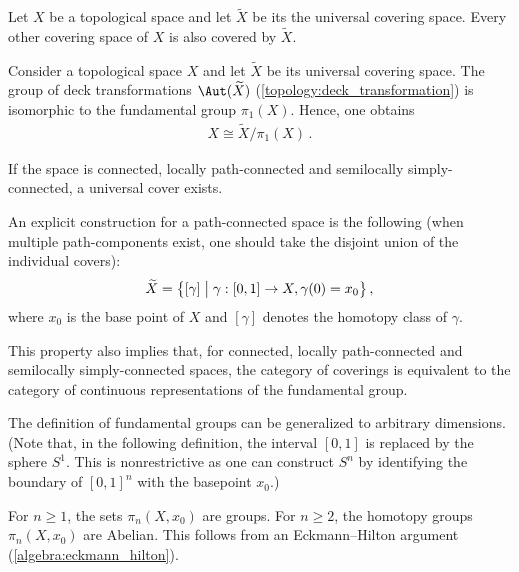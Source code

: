     \begin{uproperty}
        Let $X$ be a topological space and let $\widetilde{X}$ be its the universal covering space. Every other covering space of $X$ is also covered by $\widetilde{X}$.
    \end{uproperty}
    \begin{property}[Automorphisms]\label{topology:universal_cover_automorphisms}
        Consider a topological space $X$ and let $\widetilde{X}$ be its universal covering space. The group of deck transformations $\Aut(\widetilde{X})$ (\cref{topology:deck_transformation}) is isomorphic to the fundamental group $\pi_1(X)$. Hence, one obtains
        \begin{gather}
            X\cong\widetilde{X}/\pi_1(X)\,.
        \end{gather}
    \end{property}
    \begin{property}[Existence]
        If the space is connected, locally path-connected and semilocally simply-connected, a universal cover exists.

        An explicit construction for a path-connected space is the following (when multiple path-components exist, one should take the disjoint union of the individual covers):
        \begin{gather}
            \widetilde{X} = \bigl\{[\gamma]\bigm\vert\gamma:[0,1]\rightarrow X,\gamma(0)=x_0\bigr\}\,,
        \end{gather}
        where $x_0$ is the base point of $X$ and $[\gamma]$ denotes the homotopy class of $\gamma$.
    \end{property}
    \begin{result}\label{topology:equivalent_categories}
        This property also implies that, for connected, locally path-connected and semilocally simply-connected spaces, the category of coverings is equivalent to the category of continuous representations of the fundamental group.
    \end{result}

    The definition of fundamental groups can be generalized to arbitrary dimensions. (Note that, in the following definition, the interval $[0,1]$ is replaced by the sphere $S^1$. This is nonrestrictive as one can construct $S^n$ by identifying the boundary of $[0,1]^n$ with the basepoint $x_0$.)
    \begin{property}\label{topology:abelian_homotopy_groups}
        For $n\geq1$, the sets $\pi_n(X,x_0)$ are groups. For $n\geq2$,  the homotopy groups $\pi_n(X,x_0)$ are Abelian. This follows from an Eckmann--Hilton argument (\cref{algebra:eckmann_hilton}).
    \end{property}


